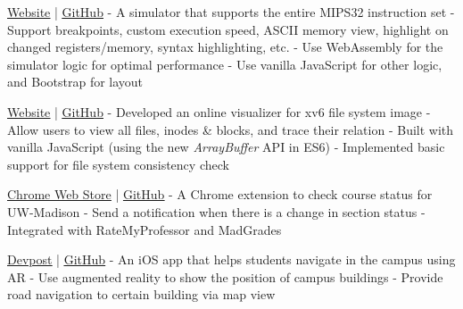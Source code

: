 \documentclass[letterpaper]{twentysecondcv} %
\begin{document}
\begin{twenty} %
    {\href{https://shawnzhong.github.io/JsSpim/}{\underline{Website}} | \href{https://github.com/ShawnZhong/JsSpim}{\underline{GitHub}}}
    {
     - A simulator that supports the entire MIPS32 instruction set \newline
     - Support breakpoints, custom execution speed, ASCII memory view, highlight on changed registers/memory, syntax highlighting, etc. \newline
     - Use WebAssembly for the simulator logic for optimal performance \newline
     - Use vanilla JavaScript for other logic, and Bootstrap for layout
    }
    
	 {\href{https://shawnzhong.github.io/xv6-file-system-visualizer/}{\underline{Website}} | \href{https://github.com/ShawnZhong/xv6-file-system-visualizer}{\underline{GitHub}}}
	{
	    - Developed an online visualizer for xv6 file system image \newline
	    - Allow users to view all files, inodes \& blocks, and trace their relation \newline
	    - Built with vanilla JavaScript (using the new \textit{ArrayBuffer} API in ES6) \newline
	    - Implemented basic support for file system consistency check 
	}
	
	 {\href{https://chrome.google.com/webstore/detail/madcourse/cijpakgnnndjbilnioofmgdededkdmpc}{\underline{Chrome Web Store}} | \href{https://github.com/ShawnZhong/MadCourse}{\underline{GitHub}}}
	{
	    - A Chrome extension to check course status for UW-Madison \newline
	    - Send a notification when there is a change in section status \newline
	    - Integrated with RateMyProfessor and MadGrades 
	}
	
	 {\href{https://devpost.com/software/badger-map-k256i9}{\underline{Devpost}} | \href{https://github.com/ShawnZhong/Badger-Map}{\underline{GitHub}}}
	{
	    - An iOS app that helps students navigate in the campus using AR \newline
	    - Use augmented reality to show the position of campus buildings \newline
	    - Provide road navigation to certain building via map view
	}
\end{twenty}
\end{document}
